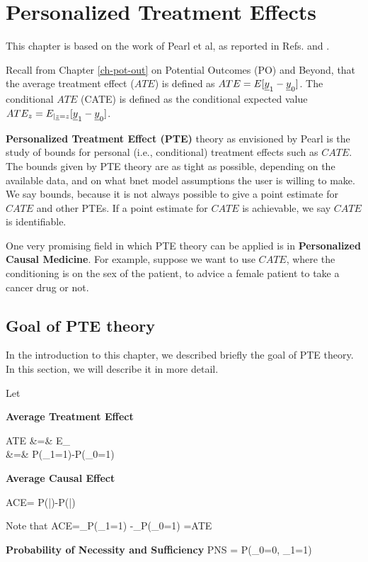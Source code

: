 \chapter{Personalized Treatment Effects}
\label{ch-personalized}


This chapter
is based on the work of Pearl et al, as reported in
Refs.
\cite{pearl-tian-2000} and
\cite{personalized-pearl-2021}.

Recall from Chapter \ref{ch-pot-out}
on Potential Outcomes (PO) 
and Beyond, that
the average treatment effect ($ATE$) 
is defined as
$ATE=E[{\underline{y}}_1-{\underline{y}}_0]$.
The conditional $ATE$ (CATE) 
is defined as
the conditional expected value
$ATE_z=E_{|{\underline{z}}=z}[{\underline{y}}_1-{\underline{y}}_0]$.


{\bf
Personalized Treatment Effect (PTE)}
theory
as envisioned by Pearl
is the study 
of
bounds
for personal (i.e., conditional)
 treatment
effects such as $CATE$. The
bounds given by PTE theory
are
as tight as possible,
depending on 
the available data,
and on what bnet model 
assumptions
the user is willing to make.
We say bounds, because 
it is not always possible
to give a point estimate
for $CATE$ and other
PTEs.
If a point estimate for $CATE$
is achievable, we say $CATE$
is identifiable.

One 
very promising
field in 
which PTE theory
can be applied
is in {\bf Personalized Causal Medicine}.
For example, suppose we want to
 use $CATE$, 
where the conditioning is on the
sex of the patient,
to advice a female  patient
to take a cancer drug or not.

\section{Goal of PTE theory}
In the introduction
to this chapter,
we described 
briefly
the goal of PTE theory. 
In this section,
we will describe it
in more detail.

Let

{\bf Average Treatment Effect}


\beqa
ATE &=& E_\s[y^\s_1-y^\s_0]
\\
&=&
P(\rvy_1=1)-P(\rvy_0=1)
\eeqa

{\bf Average Causal Effect}

\beq
ACE= P(|\cald{})-P(|\cald{})
\eeq

Note that
\beq
ACE=_{P(\rvy_1=1)}
-_{P(\rvy_0=1)}
=ATE\eeq


{\bf Probability of Necessity and Sufficiency}
\beq
PNS = P(\rvy_0=0, \rvy_1=1)
\eeq

